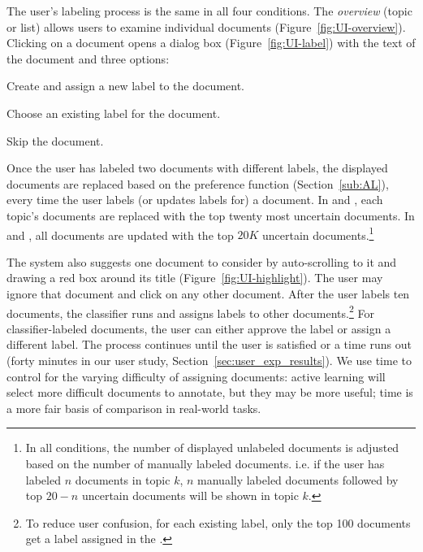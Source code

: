 The user's labeling process is the same in all four conditions. The
\emph{overview} (topic or list) allows users to examine individual
documents (Figure~\ref{fig:UI-overview}). Clicking on a document opens a dialog box
(Figure~\ref{fig:UI-label}) with the text of the document and three
options:
\begin{enumerate*}
  \item Create and assign a new label to the document.
  \item Choose an existing label for the document.
  \item Skip the document.
\end{enumerate*}








Once the user has labeled two documents with different labels, the displayed
documents are replaced based on the preference function (Section~\ref{sub:AL}),
every time the user labels (or updates labels for) a document. In  and
, each topic's documents are replaced with the top twenty most uncertain
documents. In  and , all documents are updated with the top
$20K$ uncertain documents.\footnote{In all conditions, the number of displayed unlabeled documents is adjusted based on the number of manually labeled documents. i.e. if the user has labeled $n$ documents in topic $k$, $n$ manually labeled documents followed by top $20-n$ uncertain documents will be shown in topic $k$.}

The system also suggests one document to
consider by auto-scrolling to it and drawing a red box around its title
(Figure~\ref{fig:UI-highlight}). The user may ignore that document and click on any other
document. After the user labels ten documents, the classifier runs and assigns
labels to other documents.\footnote{To reduce user confusion, for each existing
  label, only the top 100 documents get a label assigned in the .} For
classifier-labeled documents, the user can either approve the label or assign a
different label. The process continues until the user is satisfied or a time
runs out (forty minutes in our user study, Section~\ref{sec:user_exp_results}).
We use time to control for the varying difficulty of assigning documents: active
learning will select more difficult documents to annotate, but they may be more
useful; time is a more fair basis of comparison in real-world tasks.